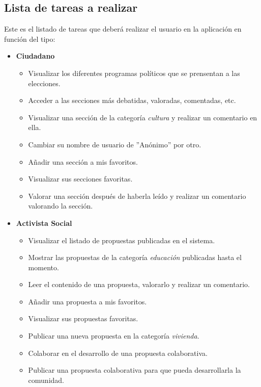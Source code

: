 \subsection{Lista de tareas a realizar}

Este es el listado de tareas que deberá realizar el usuario en la aplicación en función del tipo:

\begin{itemize}
 \item \textbf{Ciudadano}
 \begin{itemize}
  \item Visualizar los diferentes programas políticos que se prensentan a las elecciones.
  \item Acceder a las secciones más debatidas, valoradas, comentadas, etc.
  \item Visualizar una sección de la categoría \textit{cultura} y realizar un comentario en ella.
  \item Cambiar su nombre de usuario de ''Anónimo'' por otro.
  \item Añadir una sección a mis favoritos.
  \item Visualizar sus secciones favoritas.
  \item Valorar una sección después de haberla leído y realizar un comentario valorando la sección.
 \end{itemize}
\end{itemize}

\begin{itemize}
 \item \textbf{Activista Social}
 \begin{itemize}
  \item Visualizar el listado de propuestas publicadas en el sistema.
  \item Mostrar las propuestas de la categoría \textit{educación} publicadas hasta el momento.
  \item Leer el contenido de una propuesta, valorarlo y realizar un comentario.
  \item Añadir una propuesta a mis favoritos.
  \item Visualizar sus propuestas favoritas.
  \item Publicar una nueva propuesta en la categoría \textit{vivienda}.
  \item Colaborar en el desarrollo de una propuesta colaborativa.
  \item Publicar una propuesta colaborativa para que pueda desarrollarla la comunidad.
 \end{itemize}
\end{itemize}

